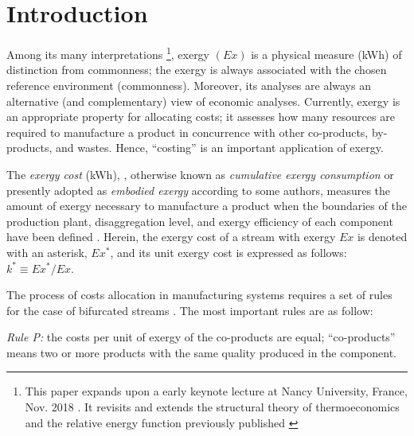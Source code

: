 \documentclass[energies,article,submit,moreauthors,pdftex]{Definitions/mdpi}
\begin{document}
\section{Introduction}
Among its many interpretations \footnote{This paper expands upon a early keynote lecture at Nancy University, France, Nov. 2018 \cite{Nancy2018}. It revisits and extends the structural theory of thermoeconomics and the relative energy function previously published \cite{Valero1992a,Valero1992b}}, exergy $(Ex)$ is a physical measure (kWh) of distinction from commonness; the exergy is always associated with the chosen reference environment (commonness). Moreover, its analyses are always an alternative (and complementary) view of economic analyses. Currently, exergy is an appropriate property for allocating costs; it assesses how many resources are required to manufacture a product in concurrence with other co-products, by-products, and wastes. Hence, “costing” is an important application of exergy.

The \emph{exergy cost} (kWh), \cite{Valero1986a}, otherwise known as \emph{cumulative exergy consumption} \cite{Morris1986,Szargut1988} or presently adopted as \emph{embodied exergy} according to some authors, measures the amount of exergy necessary to manufacture a product when the boundaries of the production plant, disaggregation level, and exergy efficiency of each component have been defined \cite{Valero1986a,Lozano1993}. Herein, the exergy cost of a stream with exergy $Ex$ is denoted with an asterisk, $Ex^*$, and its unit exergy cost is expressed as follows: $k^*\equiv Ex^*/Ex$.

The process of costs allocation in manufacturing systems requires a set of rules for the case of bifurcated streams \cite{Lozano1993,Tsatsaronis2007}. The most important rules are as follow: 

\emph{Rule P:} the costs per unit of exergy of the co-products are equal; “co-products” means two or more products with the same quality produced in the component. 
\end{document}

